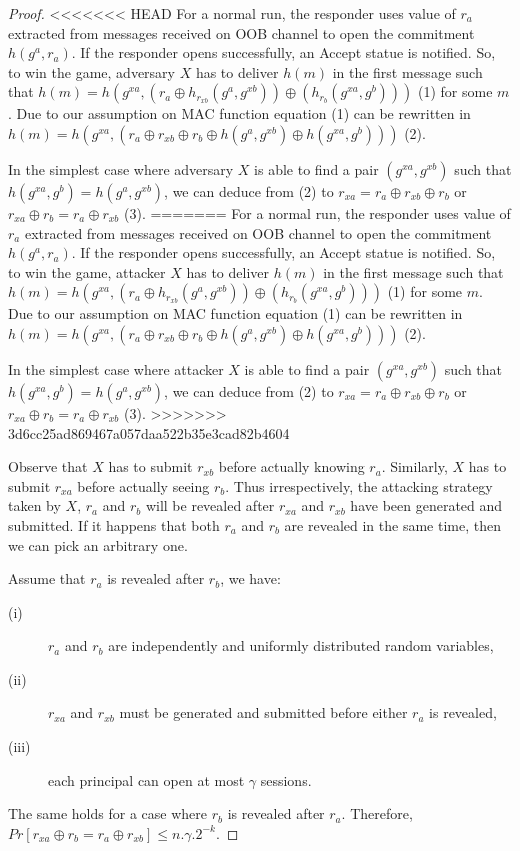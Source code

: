 \begin{proof}
<<<<<<< HEAD
For a normal run, the responder uses value of $r_a$ extracted from messages received on OOB channel to open the commitment $h(g^a, r_a)$. If the responder opens successfully, an Accept statue is notified. So, to win the game, adversary $X$ has to deliver $h(m)$ in the first message such that $h(m) = h(g^{xa}, (r_a \oplus h_{r_{xb}}(g^a,g^{xb})) \oplus (h_{r_b}(g^{xa},g^b)))$ (1) for some $m$. Due to our assumption on MAC function equation (1) can be rewritten in $h(m) = h(g^{xa}, (r_a \oplus r_{xb} \oplus r_b \oplus h(g^a,g^{xb}) \oplus h(g^{xa},g^b)))$ (2). 

In the simplest case where adversary $X$ is able to find a pair $(g^{xa},g^{xb})$ such that $h(g^{xa},g^b) = h(g^a,g^{xb})$, we can deduce from (2) to $r_{xa} = r_a \oplus r_{xb} \oplus r_b$ or $r_{xa} \oplus r_b = r_a \oplus r_{xb}$ (3).
=======
For a normal run, the responder uses value of $r_a$ extracted from messages received on OOB channel to open the commitment $h(g^a, r_a)$. If the responder opens successfully, an Accept statue is notified. So, to win the game, attacker $X$ has to deliver $h(m)$ in the first message such that $h(m) = h(g^{xa}, (r_a \oplus h_{r_{xb}}(g^a,g^{xb})) \oplus (h_{r_b}(g^{xa},g^b)))$ (1) for some $m$. Due to our assumption on MAC function equation (1) can be rewritten in $h(m) = h(g^{xa}, (r_a \oplus r_{xb} \oplus r_b \oplus h(g^a,g^{xb}) \oplus h(g^{xa},g^b)))$ (2). 

In the simplest case where attacker $X$ is able to find a pair $(g^{xa},g^{xb})$ such that $h(g^{xa},g^b) = h(g^a,g^{xb})$, we can deduce from (2) to $r_{xa} = r_a \oplus r_{xb} \oplus r_b$ or $r_{xa} \oplus r_b = r_a \oplus r_{xb}$ (3).
>>>>>>> 3d6cc25ad869467a057daa522b35e3cad82b4604

Observe that $X$ has to submit $r_{xb}$ before actually knowing $r_a$. Similarly, $X$ has to submit $r_{xa}$ before actually seeing $r_b$. Thus irrespectively, the attacking strategy taken by $X$, $r_a$ and $r_b$ will be revealed after $r_{xa}$ and $r_{xb}$ have been generated and submitted. If it happens that both $r_a$ and $r_b$ are revealed in the same time, then we can pick an arbitrary one. 

Assume that $r_a$ is revealed after $r_b$, we have:
\begin{description}
 \item [(i)] $r_a$ and $r_b$ are independently and uniformly distributed random variables, 
 \item [(ii)] $r_{xa}$ and $r_{xb}$ must be generated and submitted before either $r_a$ is revealed, 
 \item [(iii)] each principal can open at most $\gamma$ sessions. 
\end{description}
The same holds for a case where $r_b$ is revealed after $r_a$. Therefore, $Pr[r_{xa} \oplus r_b = r_a \oplus r_{xb}] \leq n.\gamma.2^{-k}$.


\end{proof}
